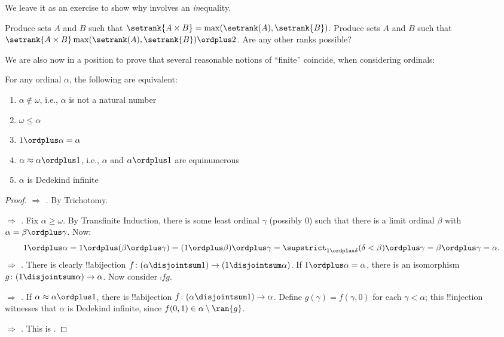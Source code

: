 \documentclass[../../../include/open-logic-section]{subfiles}
\begin{document}
We leave it as an exercise to show why  involves an
\emph{in}equality.

\begin{prob}
Produce sets $A$ and $B$ such that $\setrank{A \times B}=
\max(\setrank(A), \setrank{B})$. Produce sets $A$ and $B$ such that
$\setrank{A \times B}\max(\setrank(A), \setrank{B}) \ordplus  2$. Are
any other ranks possible?
\end{prob}

We are also now in a position to prove that several reasonable notions
of ``finite'' coincide, when considering ordinals:

\begin{lem}
For any ordinal $\alpha$, the following are equivalent:
\begin{enumerate}
	\item{} $\alpha\notin \omega$, i.e.,
	$\alpha$ is not a natural number
	\item{} $\omega \leq \alpha$ 
	\item{} $1 \ordplus  \alpha = \alpha$ 
	\item{} $\alpha \approx \alpha\ordplus 1$,
	i.e., $\alpha$ and $\alpha\ordplus 1$ are equinumerous
	\item{} $\alpha$ is Dedekind infinite	
	\end{enumerate}
\end{lem}

\begin{proof}
\emph{ $\Rightarrow$ .} By
Trichotomy. 

\emph{ $\Rightarrow$ .} Fix
$\alpha \geq \omega$. By Transfinite Induction, there is some least
ordinal $\gamma$ (possibly $0$) such that there is a limit ordinal
$\beta$ with $\alpha = \beta \ordplus \gamma$. Now:
\[
	1 \ordplus \alpha =  
	1 \ordplus (\beta \ordplus \gamma) = 
	(1 \ordplus \beta) \ordplus \gamma =  
	\supstrict_{1 \ordplus  \delta} (\delta < \beta) \ordplus  \gamma = 
	\beta \ordplus  \gamma = 
	\alpha.
\]
\emph{ $\Rightarrow$ .} There is
clearly !!a{bijection} $f \colon (\alpha \disjointsum 1) \to (1
\disjointsum \alpha)$. If $1 \ordplus \alpha = \alpha$, there is an
isomorphism $g \colon (1 \disjointsum \alpha) \to \alpha$. Now
consider $\comp{f}{g}$.

\emph{ $\Rightarrow$ .} If
$\alpha \approx \alpha \ordplus 1$, there is !!a{bijection} $f \colon
(\alpha \disjointsum 1) \to \alpha$. Define $g(\gamma) = f(\gamma, 0)$
for each $\gamma < \alpha$; this !!{injection} witnesses that $\alpha$
is Dedekind infinite, since $f(0,1) \in \alpha \setminus \ran{g}$. 

\emph{ $\Rightarrow$ .} This
is .
\end{proof}
\end{document}
